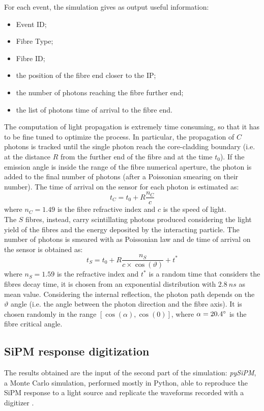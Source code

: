 For each event, the simulation gives as output useful information: 
\begin{itemize}
	\item Event ID;
	\item Fibre Type;
	\item Fibre ID;
	\item the position of the fibre end closer to the IP;
	\item the number of photons reaching the fibre further end;
	\item the list of photons time of arrival to the fibre end.
\end{itemize}

The computation of light propagation is extremely time consuming, so that it has to be fine tuned to optimize the process. In particular, the propagation of $C$ photons is tracked until the single photon reach the core-cladding boundary (i.e. at the distance $R$ from the further end of the fibre and at the time $t_0$). If the emission angle is inside the range of the fibre numerical aperture, the photon is added to the final number of photons (after a Poissonian smearing on their number).
The time of arrival on the sensor for each photon is estimated as:
\begin{equation}
t_C = t_0 + R \frac{n_C}{c}
\end{equation}
where $n_C = 1.49$ is the fibre refractive index and $c$ is the speed of light.\\

The $S$ fibres, instead, carry scintillating photons produced considering the light yield of the fibres and the energy deposited by the interacting particle. The number of photons is smeared with as Poissonian law and de time of arrival on the sensor is obtained as:
\begin{equation}
	t_S = t_0 + R\frac{n_S}{c\times \cos(\vartheta)} + t^*
\end{equation}
where $n_S = 1.59$ is the refractive index and $t^*$ is a random time that considers the fibres decay time, it is chosen from an exponential distribution with $2.8\ ns$ as mean value.
Considering the internal reflection, the photon path depends on the $\vartheta$ angle (i.e. the angle between the photon direction and the fibre axis). It is chosen randomly in the range $[\cos(\alpha),\cos(0)]$, where $\alpha = 20.4\degree$ is the fibre critical angle.\\

\subsection{SiPM response digitization} \label{subsec:Sim_SiPM}
The results obtained are the input of the second part of the simulation: \textit{pySiPM}, a Monte Carlo simulation, performed mostly in Python, able to reproduce the SiPM response to a light source and replicate the waveforms recorded with a digitizer \cite{digitizer}.\\

